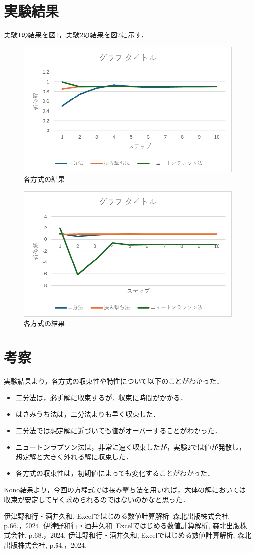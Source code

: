 \documentclass[a4paper,11pt]{ltjsarticle}
\begin{document}
\section{実験結果}
実験1の結果を図\ref{fig:result1}，実験2の結果を図\ref{fig:result2}に示す．
\begin{figure}[H]
    \centering
    \includegraphics[width=12cm]{./images/result1.png}
    \caption{各方式の結果}
    \label{fig:result1}
\end{figure}
\begin{figure}[H]
    \centering
    \includegraphics[width=12cm]{./images/result2.png}
    \caption{各方式の結果}
    \label{fig:result2}
\end{figure}


\section{考察}
実験結果より，各方式の収束性や特性について以下のことがわかった．
\begin{itemize}
    \item 二分法は，必ず解に収束するが，収束に時間がかかる．
    \item はさみうち法は，二分法よりも早く収束した．
    \item 二分法では想定解に近づいても値がオーバーすることがわかった．
    \item ニュートンラプソン法は，非常に速く収束したが，実験2では値が発散し，想定解と大きく外れる解に収束した．
    \item 各方式の収束性は，初期値によっても変化することがわかった．
\end{itemize}
Kono結果より，今回の方程式では挟み撃ち法を用いれば，大体の解においては収束が安定して早く求められるのではないのかなと思った．

\begin{thebibliography}{9}
     伊津野和行・酒井久和, Excelではじめる数値計算解析, 森北出版株式会社, p.66.，2024.
     伊津野和行・酒井久和, Excelではじめる数値計算解析, 森北出版株式会社, p.68.，2024.
     伊津野和行・酒井久和, Excelではじめる数値計算解析, 森北出版株式会社, p.64.，2024.
\end{thebibliography}
\end{document}
